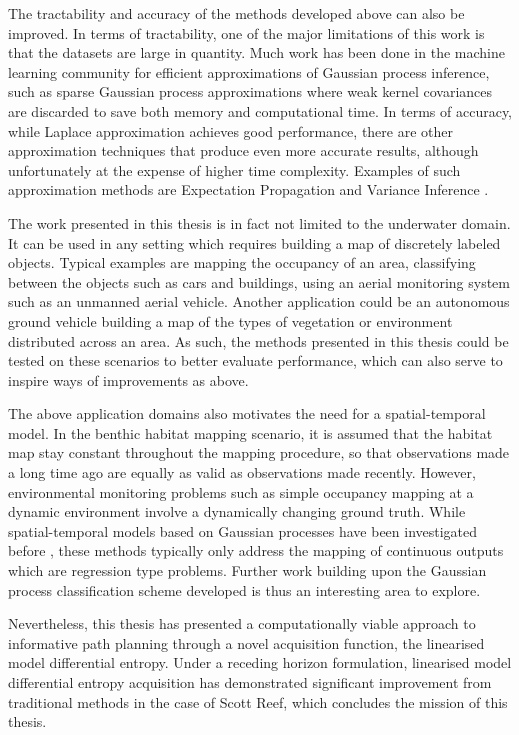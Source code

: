 	The tractability and accuracy of the methods developed above can also be improved. In terms of tractability, one of the major limitations of this work is that the datasets are large in quantity. Much work has been done in the machine learning community for efficient approximations of Gaussian process inference, such as sparse Gaussian process approximations where weak kernel covariances are discarded to save both memory and computational time. In terms of accuracy, while Laplace approximation achieves good performance, there are other approximation techniques that produce even more accurate results, although unfortunately at the expense of higher time complexity. Examples of such approximation methods are Expectation Propagation and Variance Inference \cite{GaussianProcessForMachineLearning}.
	
	The work presented in this thesis is in fact not limited to the underwater domain. It can be used in any setting which requires building a map of discretely labeled objects. Typical examples are mapping the occupancy of an area, classifying between the objects such as cars and buildings, using an aerial monitoring system such as an unmanned aerial vehicle. Another application could be an autonomous ground vehicle building a map of the types of vegetation or environment distributed across an area. As such, the methods presented in this thesis could be tested on these scenarios to better evaluate performance, which can also serve to inspire ways of improvements as above.
	
	The above application domains also motivates the need for a spatial-temporal model. In the benthic habitat mapping scenario, it is assumed that the habitat map stay constant throughout the mapping procedure, so that observations made a long time ago are equally as valid as observations made recently. However, environmental monitoring problems such as simple occupancy mapping at a dynamic environment involve a dynamically changing ground truth. While spatial-temporal models based on Gaussian processes have been investigated before \cite{Roman:SequentialBayesianOptimisation}, these methods typically only address the mapping of continuous outputs which are regression type problems. Further work building upon the Gaussian process classification scheme developed is thus an interesting area to explore.
	
	Nevertheless, this thesis has presented a computationally viable approach to informative path planning through a novel acquisition function, the linearised model differential entropy. Under a receding horizon formulation, linearised model differential entropy acquisition has demonstrated significant improvement from traditional methods in the case of Scott Reef, which concludes the mission of this thesis.

	